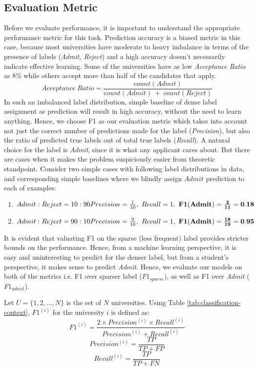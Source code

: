 \documentclass{sig-alternate-05-2015}
\begin{document}
\subsection{Evaluation Metric}
\label{subsec:evaluation-metric}
Before we evaluate performance, it is important to understand the appropriate performance metric for this task. Prediction accuracy is a biased metric in this case, because most universities have moderate to heavy imbalance in terms of the presence of labels (\textit{Admit, Reject}) and a high accuracy doesn't necessarily indicate effective learning. Some of the universities have as low \textit{Acceptance Ratio} as 8\% while others accept more than half of the candidates that apply.
$$Acceptance~Ratio = \frac{count(Admit)}{count(Admit)~+~count(Reject)}$$
In such an imbalanced label distribution, simple baseline of dense label assignment as prediction will result in high accuracy, without the need to learn anything. Hence, we choose F1 as our evaluation metric which takes into account not just the correct number of predictions made for the label (\textit{Precision}), but also the ratio of predicted true labels out of total true labels (\textit{Recall}). A natural choice for the label is \textit{Admit}, since it is what any applicant cares about. But there are cases when it makes the problem suspiciously easier from theoretic standpoint. Consider two simple cases with following label distributions in data, and corresponding simple baselines where we blindly assign $Admit$ prediction to each of examples:
\begin{enumerate}
\item $Admit:Reject = 10:90 \\
Precision = \frac{1}{10},~Recall=1,~\mathbf{F1(Admit)=\frac{2}{11}=0.18}$
\item $Admit:Reject = 90:10 \\
Precision = \frac{9}{10},~Recall=1,~\mathbf{F1(Admit)=\frac{18}{19}=0.95}$
\end{enumerate}
It is evident that valuating F1 on the sparse (less frequent) label provides stricter bounds on the performance. Hence, from a machine learning perspective, it is easy and uninteresting to predict for the denser label, but from a student's perspective, it makes sense to predict \textit{Admit}. Hence, we evaluate our models on both of the metrics i.e. F1 over sparser label ($F1_{sparse}$), as well as F1 over \textit{Admit} ($F1_{admit}$).

Let $U=\{1,2,...,N\}$ is the set of $N$ universities. Using Table \ref{tab:classification-context}, $F1^{(i)}$ for the university $i$ is defined as:
$$F1^{(i)} = \frac{2 \times Precision^{(i)} \times Recall^{(i)}}{Precision^{(i)} + Recall^{(i)}}$$
$$Precision^{(i)} = \frac{TP}{TP + FP}$$
$$Recall^{(i)} = \frac{TP}{TP + FN}$$
\end{document}
